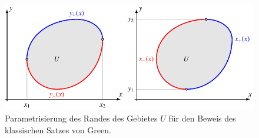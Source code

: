 %
%
%
\begin{figure}
\centering
\includegraphics{chapters/040-green/images/greenbeweis.pdf}
\caption{Parametrisierung des Randes des Gebietes $U$ für den
Beweis des klassischen Satzes von Green.
\label{buch:green:green:fig:greenbeweis}}
\end{figure}
